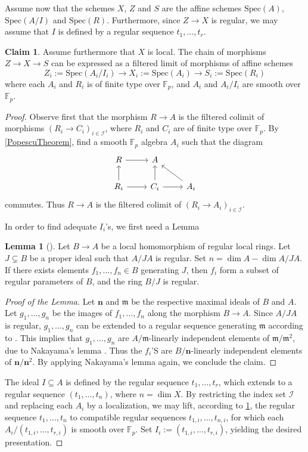 \documentclass{amsart}
\def\Spec{\textrm{Spec}}
\theoremstyle{definition}
\newtheorem{lemma}[theorem]{Lemma}
\newtheorem{claim}[theorem]{Claim}
\newcommand{\mm}{\mathfrak{m}}
\newcommand{\mF}{\mathbb{F}}
\newcommand{\nn}{\textbf{n}}
\numberwithin{equation}{section}
\begin{document}
Assume now that the schemes $X$, $Z$ and $S$ are the affine schemes $\Spec(A)$, $\Spec(A/I)$ and $\Spec(R)$. Furthermore, since $Z\to X$ is regular, we may assume that $I$ is defined by a regular sequence $t_1,\dots,t_r$. 
 
 \begin{claim}\label{filteringDescriptionOfXZS}
 	Assume furthermore that $X$ is local. The chain of morphisms $Z\to X\to S$ can be expressed as a filtered limit of morphisms of affine schemes
 	\[
 	Z_i:=\Spec (A_i/I_i)\to X_i:=\Spec(A_i)\to S_i:=\Spec(R_i)
 	\]
 	where each $A_i$ and $R_i$ is of finite type over $\mF_p$, and $A_i$ and $A_i/I_i$ are smooth over $\mF_p$. 
 \end{claim}
 \begin{proof}
 	Observe first that the morphism $R\to A$ is the filtered colimit of morphisms $(R_i\to C_i)_{i\in \mathcal{I}}$, where $R_i$ and $C_i$ are of finite type over $\mF_p$. By \cref{PopescuTheorem}, find a smooth $\mF_p$ algebra $A_i$ such that the diagram
 	\[
 	\begin{tikzcd}
 		R\ar[r]&A&\\
 		R_i\ar[u]\ar[r]&C_i\ar[u]\ar[r]&A_i\ar[ul]
 	\end{tikzcd}
 	\] 
 	commutes. Thus $R\to A$ is the filtered colimit of $(R_i\to A_i)_{i\in \mathcal{I}}$. 
 	
 	In order to find adequate $I_i$'s, we first need a Lemma
 	\begin{lemma}[{\cite[Lemma C.7.]{DegliseRationalMotivic}}] \label{lem:FromRegularToSmoothGenerators}
 		Let $B\to A$ be a local homomorphism of regular local rings. Let $J\subsetneq B$ be a proper  ideal such that $A/JA$ is regular. Set $n=\dim A -\dim A/JA$. If there exists elements $f_1,\dots, f_n\in B$ generating $J$, then $f_i$ form a subset of regular parameters of $B$, and the ring $B/J$ is regular. 
 	\end{lemma}
 	\begin{proof}[Proof of the Lemma]
 		Let $\nn$ and $\mm$ be the respective maximal ideals of $B$ and $A$. Let $g_1,\dots,g_n$ be the images of $f_1,\dots,f_n$ along the morphism $B\to A$. Since $A/JA$ is regular,  $g_1,\dots,g_n$ can be extended to a regular sequence generating $\mm$ according to \cite[Lemma 00NR]{Stacks}.  This implies that $g_1,\dots,g_n$ are $A/\mm$-linearly independent elements of $\mm/\mm^2$, due to Nakayama's lemma \cite[Lemma 00DV]{Stacks}. Thus the $f_i$'S are $B/\nn$-linearly independent elements of $\nn/\nn^2$. By applying Nakayama's lemma again, we conclude the claim.
 	\end{proof}
 	 The ideal $I\subseteq A$ is defined by the regular sequence $t_1,\dots,t_r$, which extends to a regular sequence $(t_1,\dots,t_n)$, where $n=\dim X$.  By restricting the index set $\mathcal{I}$ and replacing each $A_i$ by a localization, we may lift, according to \cref{lem:FromRegularToSmoothGenerators}, the regular sequence $t_1,\dots, t_n$ to compatible regular sequences $t_{1,i},\dots,t_{n,i}$, for which each $A_i/(t_{1,i},\dots,t_{r,i})$ is smooth over $\mF_p$. Set $I_i:=(t_{1,i},\dots,t_{r,i})$, yielding the desired presentation.
 \end{proof} 
 
\end{document}
